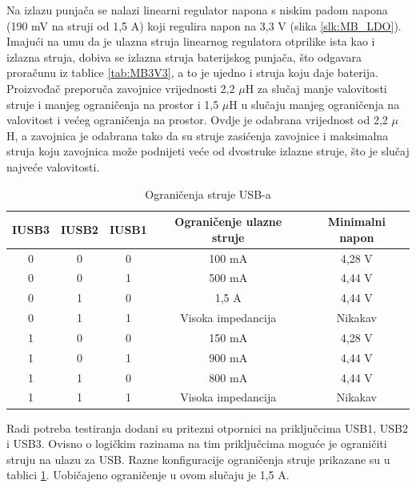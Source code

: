 Na izlazu punjača se nalazi linearni regulator napona s niskim padom napona (190 mV na struji od 1,5 A) koji regulira napon na 3,3 V (slika \ref{slk:MB_LDO}). Imajući na umu da je ulazna struja linearnog regulatora otprilike ista kao i izlazna struja, dobiva se izlazna struja baterijskog punjača, što odgavara proračunu iz tablice \ref{tab:MB3V3}, a to je ujedno i struja koju daje baterija. Proizvođač preporuča zavojnice vrijednosti 2,2 $\mu$H za slučaj manje valovitosti struje i manjeg ograničenja na prostor i 1,5 $\mu$H u slučaju manjeg ograničenja na valovitost i većeg ograničenja na prostor. Ovdje je odabrana vrijednost od 2,2 $\mu$H, a zavojnica je odabrana tako da su struje zasićenja zavojnice i maksimalna struja koju zavojnica može podnijeti veće od dvostruke izlazne struje, što je slučaj najveće valovitosti.
\begin{table}[!htb]
    \centering
    \caption{Ograničenja struje USB-a \cite{ti:bq24166}}
    \begin{tabular}{|c|c|c|c|c|} \hline
    IUSB3 & IUSB2 & IUSB1 & Ograničenje ulazne struje & Minimalni napon \\
    \hline
    0 & 0 & 0 & 100 mA & 4,28 V \\
    \hline
    0 & 0 & 1 & 500 mA & 4,44 V \\
    \hline
    0 & 1 & 0 & 1,5 A & 4,44 V \\
    \hline
    0 & 1 & 1 & Visoka impedancija & Nikakav \\
    \hline
    1 & 0 & 0 & 150 mA & 4,28 V \\
    \hline
    1 & 0 & 1 & 900 mA & 4,44 V \\
    \hline
    1 & 1 & 0 & 800 mA & 4,44 V \\
    \hline
    1 & 1 & 1 & Visoka impedancija & Nikakav \\
    \hline
    \end{tabular}%
    \label{tab:USB_ILIM}%
\end{table}%

Radi potreba testiranja dodani su pritezni otpornici na priključcima USB1, USB2 i USB3. Ovisno o logičkim razinama na tim priključcima moguće je ograničiti struju na ulazu za USB. Razne konfiguracije ograničenja struje prikazane su u tablici \ref{tab:USB_ILIM}. Uobičajeno ograničenje u ovom slučaju je 1,5 A.

